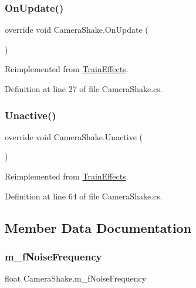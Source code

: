\subsubsection{\texorpdfstring{On\+Update()}{OnUpdate()}}
{\footnotesize\ttfamily override void Camera\+Shake.\+On\+Update (\begin{DoxyParamCaption}{ }\end{DoxyParamCaption})\hspace{0.3cm}{\ttfamily [virtual]}}



Reimplemented from \mbox{\hyperlink{class_train_effects_a245e2891464a93bda2d8f80c1fb53e2c}{Train\+Effects}}.



Definition at line 27 of file Camera\+Shake.\+cs.

\mbox{\label{class_camera_shake_ac7c118994512130c10ff57af288fe43e}} 
\subsubsection{\texorpdfstring{Unactive()}{Unactive()}}
{\footnotesize\ttfamily override void Camera\+Shake.\+Unactive (\begin{DoxyParamCaption}{ }\end{DoxyParamCaption})\hspace{0.3cm}{\ttfamily [virtual]}}



Reimplemented from \mbox{\hyperlink{class_train_effects_a126011673013f79d482f135be84afc96}{Train\+Effects}}.



Definition at line 64 of file Camera\+Shake.\+cs.



\subsection{Member Data Documentation}
\mbox{\label{class_camera_shake_a69bceb25e43a423052df30cda3b189aa}} 
\subsubsection{\texorpdfstring{m\+\_\+f\+Noise\+Frequency}{m\_fNoiseFrequency}}
{\footnotesize\ttfamily float Camera\+Shake.\+m\+\_\+f\+Noise\+Frequency}



